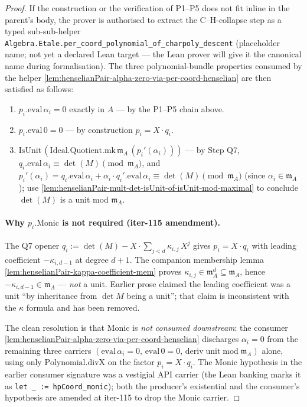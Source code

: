 \begin{proof}
If the construction or the verification of P1--P5 does not fit
inline in the parent's body, the prover is authorised to extract
the C--H-collapse step as a typed sub-sub-helper
\texttt{Algebra.Etale.per\_coord\_polynomial\_of\_charpoly\_descent}
(placeholder name; not yet a declared Lean target — the Lean
prover will give it the canonical name during formalisation).
The three polynomial-bundle properties consumed by the helper
\cref{lem:henselianPair-alpha-zero-via-per-coord-henselian} are
then satisfied as follows:
\begin{enumerate}
\item $p_i.\mathrm{eval}\,\alpha_i = 0$ exactly in $A$ — by the
P1--P5 chain above.
\item $p_i.\mathrm{eval}\,0 = 0$ — by construction $p_i = X \cdot
q_i$.
\item $\mathrm{IsUnit}\,(\mathrm{Ideal.Quotient.mk}\,\mathfrak m_A
\,(p_i'(\alpha_i)))$ — by Step Q7,
$q_i.\mathrm{eval}\,\alpha_i \equiv \det(M) \pmod{\mathfrak m_A}$,
and $p_i'(\alpha_i) = q_i.\mathrm{eval}\,\alpha_i + \alpha_i
\cdot q_i'.\mathrm{eval}\,\alpha_i \equiv \det(M) \pmod{\mathfrak m_A}$
(since $\alpha_i \in \mathfrak m_A$); use
\cref{lem:henselianPair-mult-det-isUnit-of-isUnit-mod-maximal}
to conclude $\det(M)$ is a unit mod $\mathfrak m_A$.
\end{enumerate}

\paragraph{Why $p_i.\mathrm{Monic}$ is not required (iter-115
amendment).} The Q7 opener $q_i := \det(M) - X \cdot \sum_{j < d}
\kappa_{i,j}\,X^j$ gives $p_i = X \cdot q_i$ with leading
coefficient $-\kappa_{i, d-1}$ at degree $d + 1$. The companion
membership lemma
\cref{lem:henselianPair-kappa-coefficient-mem} proves
$\kappa_{i,j} \in \mathfrak m_A^d \subseteq \mathfrak m_A$, hence
$-\kappa_{i, d-1} \in \mathfrak m_A$ — \emph{not} a unit.
Earlier prose claimed the leading coefficient was a unit ``by
inheritance from $\det M$ being a unit''; that claim is
inconsistent with the $\kappa$ formula and has been removed.

The clean resolution is that $\mathrm{Monic}$ is \emph{not
consumed downstream}: the consumer
\cref{lem:henselianPair-alpha-zero-via-per-coord-henselian}
discharges $\alpha_i = 0$ from the remaining three carriers
$(\mathrm{eval}\,\alpha_i = 0,\,\mathrm{eval}\,0 = 0,\,
\mathrm{deriv\;unit\;mod\;}\mathfrak m_A)$ alone, using only
$\mathrm{Polynomial.divX}$ on the factor $p_i = X \cdot q_i$. The
Monic hypothesis in the earlier consumer signature was a
vestigial API carrier (the Lean banking marks it as
\texttt{let \_ := hpCoord\_monic}); both the producer's
existential and the consumer's hypothesis are amended at iter-115
to drop the Monic carrier.


\end{proof}
